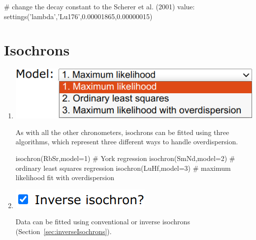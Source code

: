 \begin{refsection}
\begin{script}
# change the decay constant to the Scherer et al. (2001) value:
settings('lambda','Lu176',0.00001865,0.00000015)
\end{script}

\section{Isochrons}\label{sec:PDisochrons}

\begin{enumerate}

\item\noindent\begin{minipage}[t]{.45\linewidth}
\strut\vspace*{-\baselineskip}\newline
\includegraphics[width=\linewidth]{../figures/PbPbIsochronModels.png}
\end{minipage}
\begin{minipage}[t]{.55\linewidth}
  As with all the other chronometers, isochrons can be fitted using
  three algorithms, which represent three different ways to handle
  overdispersion.
\end{minipage}

\begin{script}
isochron(RbSr,model=1) # York regression
isochron(SmNd,model=2) # ordinary least squares regression
isochron(LuHf,model=3) # maximum likelihood fit with overdispersion
\end{script}

\item\noindent\begin{minipage}[t]{.22\linewidth}
  \strut\vspace*{-1.2\baselineskip}\newline
  \includegraphics[width=\linewidth]{../figures/PbPbisochronInverse.png}
\end{minipage}
  \begin{minipage}[t]{.78\linewidth}
    Data can be fitted using conventional or inverse isochrons
    (Section~\ref{sec:inverseIsochrons}).
\end{minipage}


\end{enumerate}
\end{refsection}
